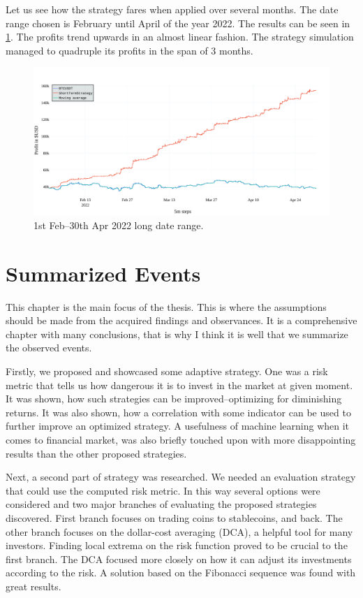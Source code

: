 Let us see how the strategy fares when applied over several months. The date range chosen is February until April of the year 2022. The results can be seen in \ref{figure-short-term-long}. The profits trend upwards in an almost linear fashion. The strategy simulation managed to quadruple its profits in the span of 3 months.

\begin{figure}[!hbt]
    \centering
    \includegraphics[width=\columnwidth]{figures/short-term-long.pdf}
    \caption{1st Feb--30th Apr 2022 long date range.}
    \label{figure-short-term-long}
\end{figure}

\section{Summarized Events}
\label{section-summarized-events}
This chapter is the main focus of the thesis. This is where the assumptions should be made from the acquired findings and observances. It is a comprehensive chapter with many conclusions, that is why I think it is well that we summarize the observed events.

Firstly, we proposed and showcased some adaptive strategy. One was a risk metric that tells us how dangerous it is to invest in the market at given moment. It was shown, how such strategies can be improved--optimizing for diminishing returns. It was also shown, how a correlation with some indicator can be used to further improve an optimized strategy. A usefulness of machine learning when it comes to financial market, was also briefly touched upon with more disappointing results than the other proposed strategies.

Next, a second part of strategy was researched. We needed an evaluation strategy that could use the computed risk metric. In this way several options were considered and two major branches of evaluating the proposed strategies discovered. First branch focuses on trading coins to stablecoins, and back. The other branch focuses on the dollar-cost averaging (DCA), a helpful tool for many investors. Finding local extrema on the risk function proved to be crucial to the first branch. The DCA focused more closely on how it can adjust its investments according to the risk. A solution based on the Fibonacci sequence was found with great results.

